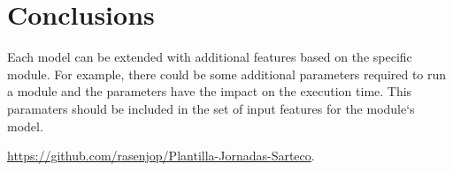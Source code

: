 \section{Conclusions}

Each model can be extended with additional features based on the specific module. For example, there could be some additional parameters required to run a module and the parameters have the impact on the execution time. This paramaters should be included in the set of input features for the module`s model.

\url{https://github.com/rasenjop/Plantilla-Jornadas-Sarteco}.